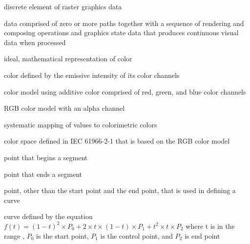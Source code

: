 %
discrete element of raster graphics data

%
data comprised of zero or more paths together with a sequence of rendering and composing operations and graphics state data that produces continuous visual data when processed

%
ideal, mathematical representation of color

%
color defined by the emissive intensity of its color channels

%
%
color model using additive color comprised of red, green, and blue color channels

%
%
RGB color model with an alpha channel

%
systematic mapping of values to colorimetric colors

%
%
color space defined in IEC 61966-2-1 that is based on the RGB color model

%
%

%
point that begins a segment

%
point that ends a segment

%
point, other than the start point and the end point, that is used in defining a curve

%
%
 curve defined by the 
equation $f(t) = (1 - t)^{2} \times P_{0} + 2 \times t \times (1 - t) 
\times P_{1} + t^{2} \times t \times P_{2}$ where t is in the range , $P_{0}$ is the start point, $P_{1}$ is the control point, and $P_{2}$ is end point

